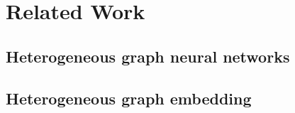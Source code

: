 \section{Related Work}
\label{sec:related}
\subsection{Heterogeneous graph neural networks}
\subsection{Heterogeneous graph embedding}


















